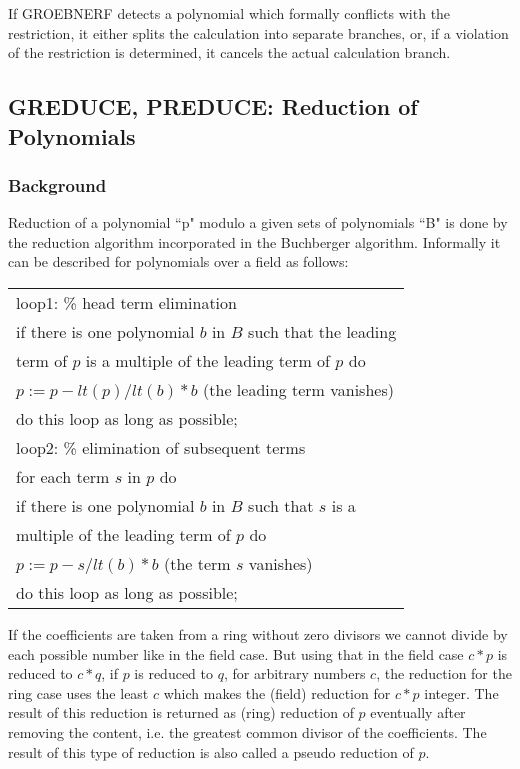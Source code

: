 If GROEBNERF detects a polynomial which formally conflicts with the
restriction, it either splits the calculation into separate branches, or,
if a violation of the restriction is determined, it cancels the actual
calculation branch.

\subsection{GREDUCE, PREDUCE: Reduction of Polynomials}

\subsubsection{Background}
Reduction of a polynomial ``p" modulo a given sets of polynomials
``B" is done by the reduction algorithm incorporated in the
Buchberger algorithm. Informally it can be described for
polynomials over a field as follows:
\begin{center}
\begin{tabular}{l}
loop1: \hspace*{2mm}\% head term elimination \\
\hspace*{-1cm} if there is one polynomial $b$ in $B$ such that the
leading \\ term of $p$ is a multiple of the leading term of $p$ do \\
$p := p - lt(p)/lt(b) * b$  (the leading term vanishes)\\
\hspace*{-1cm} do this loop as long as possible; \\
loop2: \hspace*{2mm} \% elimination of subsequent terms \\
\hspace*{-1cm} for each term $s$ in $p$ do \\
if there is one polynomial $b$ in $B$ such that $s$ is a\\
multiple of the leading term of $p$ do \\
$p := p - s/lt(b) * b$ (the term $s$ vanishes) \\
\hspace*{-1cm}do this loop as long as possible;
\end{tabular}
\end{center}

If the coefficients are taken from a ring without zero divisors we
cannot divide by each possible number like in the field case. But
using that in the field case  $c*p $ is reduced to  $c*q $, if $ p $
is reduced to $ q $, for arbitrary numbers $ c $,  the reduction for
the ring case uses the least $ c $ which makes the (field) reduction
for $ c*p $ integer. The result of this reduction is returned as
(ring) reduction of $ p $ eventually after removing the content, i.e.
the greatest common divisor of the coefficients. The result of this
type of reduction is also called a pseudo reduction of $ p $.


